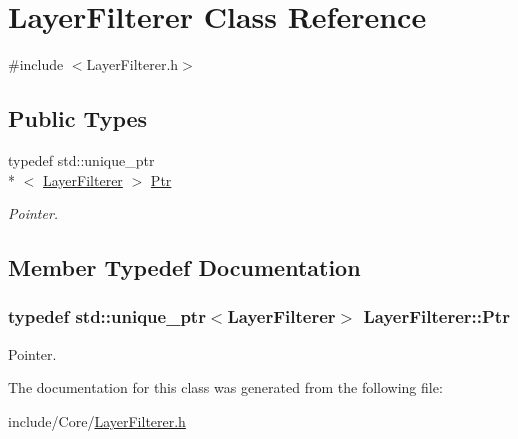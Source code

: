 \hypertarget{class_layer_filterer}{\section{Layer\-Filterer Class Reference}
\label{class_layer_filterer}
}


{\ttfamily \#include $<$Layer\-Filterer.\-h$>$}

\subsection*{Public Types}
\begin{DoxyCompactItemize}
\item 
typedef std\-::unique\-\_\-ptr\\*
$<$ \hyperlink{class_layer_filterer}{Layer\-Filterer} $>$ \hyperlink{class_layer_filterer_af5e176ab8326c56ad59ef2db5216967f}{Ptr}
\begin{DoxyCompactList}\small\item\em Pointer. \end{DoxyCompactList}\end{DoxyCompactItemize}


\subsection{Member Typedef Documentation}
\hypertarget{class_layer_filterer_af5e176ab8326c56ad59ef2db5216967f}{
\subsubsection[{Ptr}]{\setlength{\rightskip}{0pt plus 5cm}typedef std\-::unique\-\_\-ptr$<${\bf Layer\-Filterer}$>$ {\bf Layer\-Filterer\-::\-Ptr}}}\label{class_layer_filterer_af5e176ab8326c56ad59ef2db5216967f}


Pointer. 



The documentation for this class was generated from the following file\-:\begin{DoxyCompactItemize}
\item 
include/\-Core/\hyperlink{_layer_filterer_8h}{Layer\-Filterer.\-h}\end{DoxyCompactItemize}
